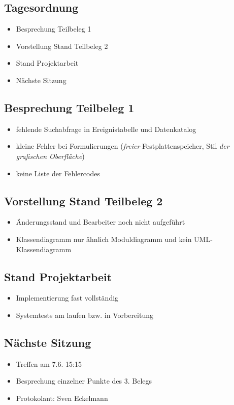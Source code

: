 		\subsection{Tagesordnung}
		\begin{itemize}
			\item Besprechung Teilbeleg 1
			\item Vorstellung Stand Teilbeleg 2
			\item Stand Projektarbeit
			\item Nächste Sitzung
		\end{itemize}
			\subsection{Besprechung Teilbeleg 1}
			\begin{itemize}
				\item fehlende Suchabfrage in Ereignistabelle und Datenkatalog
				\item kleine Fehler bei Formulierungen ({\it freier} Festplattenspeicher, Stil {\it der grafischen Oberfläche})
				\item keine Liste der Fehlercodes
			\end{itemize}
			\subsection{Vorstellung Stand Teilbeleg 2}
			\begin{itemize}
				\item Änderungsstand und Bearbeiter noch nicht aufgeführt
				\item Klassendiagramm nur ähnlich Moduldiagramm und kein UML-Klassendiagramm
			\end{itemize}
			\subsection{Stand Projektarbeit}
			\begin{itemize}
				\item Implementierung fast vollständig
				\item Systemtests am laufen bzw. in Vorbereitung
			\end{itemize}
			\subsection{Nächste Sitzung}
			\begin{itemize}
				\item Treffen am 7.6. 15:15
				\item Besprechung einzelner Punkte des 3. Belegs
			\end{itemize}
		\begin{itemize}
			\item Protokolant: Sven Eckelmann
		\end{itemize}
\newpage
